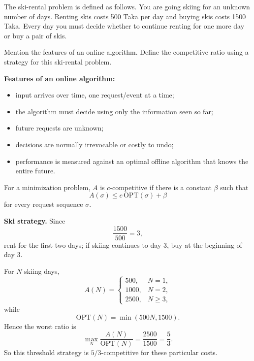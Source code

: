 \documentclass[11pt,a4paper]{article}
\newcommand{\OPT}{\mathrm{OPT}}
\begin{document}
\begin{qaquestion}
The ski-rental problem is defined as follows. You are going skiing for an unknown number of days. Renting skis costs 500 Taka per day and buying skis costs 1500 Taka. Every day you must decide whether to continue renting for one more day or buy a pair of skis.

Mention the features of an online algorithm. Define the competitive ratio using a strategy for this ski-rental problem.
\end{qaquestion}

\begin{qaanswer}[Answer 7(a)]
\textbf{Features of an online algorithm:}
\begin{itemize}[leftmargin=1.5em]
\item input arrives over time, one request/event at a time;
\item the algorithm must decide using only the information seen so far;
\item future requests are unknown;
\item decisions are normally irrevocable or costly to undo;
\item performance is measured against an optimal offline algorithm that knows the entire future.
\end{itemize}

For a minimization problem, \(A\) is \(c\)-competitive if there is a constant \(\beta\) such that
\[
A(\sigma)\le c\,\OPT(\sigma)+\beta
\]
for every request sequence \(\sigma\).

\textbf{Ski strategy.} Since
\[
\frac{1500}{500}=3,
\]
rent for the first two days; if skiing continues to day 3, buy at the beginning of day 3.

For \(N\) skiing days,
\[
A(N)=
\begin{cases}
500,&N=1,\\
1000,&N=2,\\
2500,&N\ge3,
\end{cases}
\]
while
\[
\OPT(N)=\min(500N,1500).
\]
Hence the worst ratio is
\[
\max_N\frac{A(N)}{\OPT(N)}
=\frac{2500}{1500}
=\boxed{\frac53}.
\]
So this threshold strategy is \(5/3\)-competitive for these particular costs.
\end{qaanswer}
\end{document}
